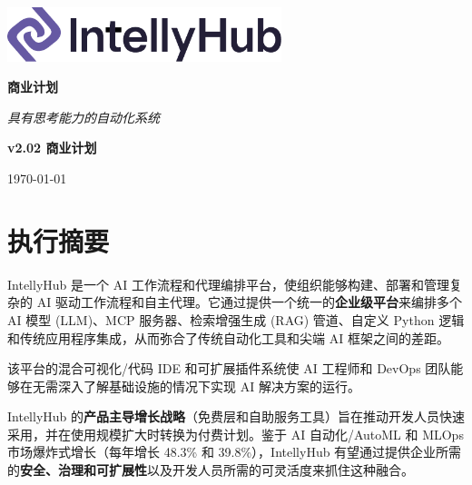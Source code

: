 \documentclass[11pt, a4paper, oneside]{article}
\begin{document}
\thispagestyle{empty} 
\begin{titlepage}
    \centering
    \vspace{1cm}
    
    \includegraphics[width=0.6\textwidth]{IntellyHub_Logo_Colored.png}
    
    \vspace{2.5cm}
    
    {\Huge\bfseries\color{PrimaryColor}商业计划}
    
    \vspace{1.5cm}
    
    {\Large\itshape\lightfont  具有思考能力的自动化系统}
    
    \vfill %
    
    {\large\bfseries\color{PrimaryColor}v2.02 \color{SecondaryColor}商业计划}
    
    \vspace{0.5cm}
    
    {\large \today}
    
\end{titlepage}

\tableofcontents
\newpage


\section{执行摘要}
IntellyHub 是一个 AI 工作流程和代理编排平台，使组织能够构建、部署和管理复杂的 AI 驱动工作流程和自主代理。它通过提供一个统一的\textbf{企业级平台}来编排多个 AI 模型 (LLM)、MCP 服务器、检索增强生成 (RAG) 管道、自定义 Python 逻辑和传统应用程序集成，从而弥合了传统自动化工具和尖端 AI 框架之间的差距。

该平台的混合可视化/代码 IDE 和可扩展插件系统使 AI 工程师和 DevOps 团队能够在无需深入了解基础设施的情况下实现 AI 解决方案的运行。

IntellyHub 的\textbf{产品主导增长战略}（免费层和自助服务工具）旨在推动开发人员快速采用，并在使用规模扩大时转换为付费计划。鉴于 AI 自动化/AutoML 和 MLOps 市场爆炸式增长（每年增长 48.3\%\cite{AIMarket} 和 39.8\%\cite{MLOpsMarket}），IntellyHub 有望通过提供企业所需的\textbf{安全、治理和可扩展性}以及开发人员所需的可灵活度来抓住这种融合。
\end{document}
